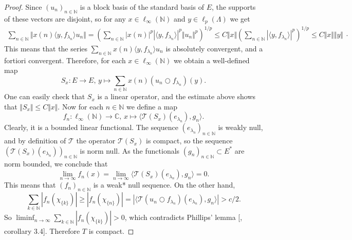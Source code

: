 \documentclass[12pt]{article}
\begin{document}
\begin{proof}
    Since $(u_n)_{n\in\mathbb{N}}$ is a block basis of the standard basis 
    of $E$, the supports of these vectors are disjoint, so for 
    any $x\in\ell_\infty(\mathbb{N})$ and $y\in\ell_p(\Lambda)$ we get
    \[
        \begin{aligned}
            \sum_{n\in\mathbb{N}}\Vert x(n) \langle y, f_{\lambda_n}\rangle u_n \Vert
            =\left(
                \sum_{n\in\mathbb{N}}
                    |x(n)|^p|\langle y, f_{\lambda_n}\rangle|^p \Vert u_n \Vert^p
            \right)^{1/p}
            \leq C \Vert x\Vert \left(
                \sum_{n\in\mathbb{N}}|\langle y, f_{\lambda_n}\rangle|^p
            \right)^{1/p}
            \leq C \Vert x\Vert\Vert y\Vert
        \end{aligned}.
    \]
    This means that the series 
    $
        \sum_{n\in\mathbb{N}} x(n) \langle y, f_{\lambda_n}\rangle u_n
    $
    is absolutely convergent, and a fortiori convergent.
    Therefore, for each $x\in\ell_\infty(\mathbb{N})$ we obtain a well-defined 
    map 
    \[
        S_x: 
        E\to E, \,
        y\mapsto \sum_{n\in\mathbb{N}} x(n)(u_n\bigcirc f_{\lambda_n})(y).
    \]
    One can easily check that $S_x$ is a linear operator, and the estimate above 
    shows that $\Vert S_x\Vert\leq C\Vert x\Vert$. Now for each $n\in\mathbb{N}$ 
    we define a map
    \[
        f_n: 
        \ell_\infty(\mathbb{N})\to\mathbb{C}, \,
        x\mapsto \langle \mathcal{T}(S_x)(e_{\lambda_n}), g_n\rangle.
    \]
    Clearly, it is a bounded linear functional. The 
    sequence $(e_{\lambda_n})_{n\in\mathbb{N}}$ is weakly null, and by definition 
    of $\mathcal{T}$ the operator $\mathcal{T}(S_x)$ is 
    compact, so the sequence 
    $
        (\mathcal{T}(S_x)(e_{\lambda_n}))_{n\in\mathbb{N}}
    $ is norm null. As the functionals $(g_n)_{n\in\mathbb{N}}\subset E^*$ are 
    norm bounded, we conclude that
    \[
        \lim_{n\to\infty}f_n(x)
        =\lim_{n\to\infty}\langle \mathcal{T}(S_x)(e_{\lambda_n}), g_n\rangle
        =0.
    \]
    This means that $(f_n)_{n\in\mathbb{N}}$ is a weak* null sequence. On the 
    other hand, 
    \[
        \sum_{k\in\mathbb{N}}|f_n(\chi_{\{k\}})|
        \geq |f_n(\chi_{\{n\}})|
        =|\langle 
            \mathcal{T}(u_n\bigcirc f_{\lambda_n})(e_{\lambda_n}), g_n
        \rangle|
        > c/2.
    \]
    So $\liminf_{n\to\infty}\sum_{k\in\mathbb{N}}|f_n(\chi_{\{k\}})|>0$,
    which contradicts Phillips' lemma [\cite{PhilOnLinTransfrm}, corollary 3.4].
    Therefore $T$ is compact.
\end{proof}
\end{document}
